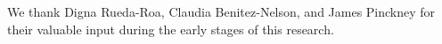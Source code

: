 \documentclass[draft]{agujournal2019}
\begin{document}


\acknowledgments
We thank Digna Rueda-Roa, Claudia Benitez-Nelson, and James Pinckney for their valuable input during the early stages of this research. 



%
%
\end{document}
